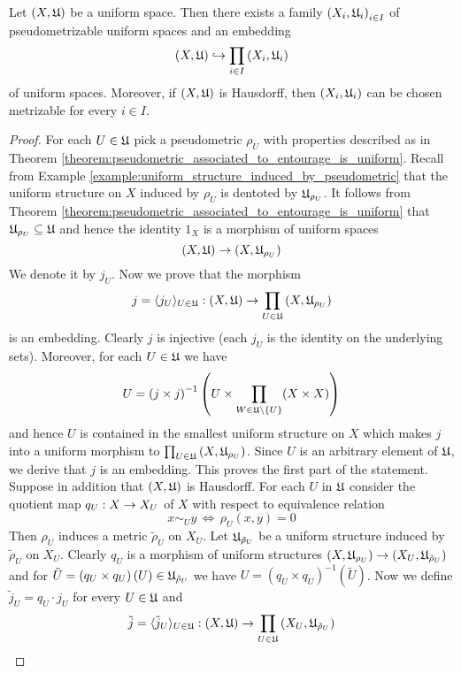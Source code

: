 \begin{theorem}\label{theorem:uniform_space_is_subspace_of_product_of_pseudometrizable_spaces}
Let $(X,{\mathfrak U})$ be a uniform space. Then there exists a family $\left(X_i,{\mathfrak U}_i\right)_{i\in I}$ of pseudometrizable uniform spaces and an embedding
$$\left(X,{\mathfrak U}\right)\hookrightarrow \prod_{i\in I}\left(X_i,{\mathfrak U}_i\right)$$
of uniform spaces. Moreover, if $\left(X,{\mathfrak U}\right)$ is Hausdorff, then $\left(X_i,{\mathfrak U}_i\right)$ can be chosen metrizable for every $i\in I$.
\end{theorem}
\begin{proof}
For each $U \in {\mathfrak U}$ pick a pseudometric $\rho_{U}$ with properties described as in Theorem \ref{theorem:pseudometric_associated_to_entourage_is_uniform}. Recall from Example \ref{example:uniform_structure_induced_by_pseudometric} that the uniform structure on $X$ induced by $\rho_U$ is dentoted by ${\mathfrak U}_{\rho_{U}}$. It follows from Theorem \ref{theorem:pseudometric_associated_to_entourage_is_uniform} that ${\mathfrak U}_{\rho_{U}}\subseteq {\mathfrak U}$ and hence the identity $1_X$ is a morphism of uniform spaces
$$\left(X,{\mathfrak U}\right)\rightarrow \left(X,{\mathfrak U}_{\rho_{U}}\right)$$
We denote it by $j_U$. Now we prove that the morphism 
$$j = \langle j_U\rangle_{U\in {\mathfrak U}}:\left(X,{\mathfrak U}\right)\rightarrow \prod_{U\in {\mathfrak U}}\left(X,{\mathfrak U}_{\rho_U}\right)$$
is an embedding. Clearly $j$ is injective (each $j_U$ is the identity on the underlying sets). Moreover, for each $U \in {\mathfrak U}$ we have
$$U = \left(j\times j\right)^{-1}\left(U\times \prod_{W\in {\mathfrak U}\setminus \{U\}}(X\times X)\right)$$
and hence $U$ is contained in the smallest uniform structure on $X$ which makes $j$ into a uniform morphism to $\prod_{U\in {\mathfrak U}}\left(X,{\mathfrak U}_{\rho_U}\right)$. Since $U$ is an arbitrary element of ${\mathfrak U}$, we derive that $j$ is an embedding. This proves the first part of the statement. Suppose in addition that $\left(X,{\mathfrak U}\right)$ is Hausdorff. For each $U$ in ${\mathfrak U}$ consider the quotient map $q_U:X\rightarrow X_U$ of $X$ with respect to equivalence relation 
$$x\sim_U y\,\Leftrightarrow\,\rho_U(x,y) = 0$$
Then $\rho_U$ induces a metric $\tilde{\rho}_U$ on $X_U$. Let ${\mathfrak U}_{\tilde{\rho}_U}$ be a uniform structure induced by $\tilde{\rho}_U$ on $X_U$. Clearly $q_U$ is a morphism of uniform structures $\left(X,{\mathfrak U}_{\rho_U}\right)\rightarrow \left(X_U,{\mathfrak U}_{\tilde{\rho}_U}\right)$ and for $\tilde{U} = \left(q_U\times q_U\right)(U) \in {\mathfrak U}_{\tilde{\rho}_U}$ we have $U = \left(q_U\times q_U\right)^{-1}\left(\tilde{U}\right)$. Now we define $\tilde{j}_U = q_U\cdot j_U$ for every $U \in {\mathfrak U}$ and 
$$\tilde{j} = \langle \tilde{j}_U\rangle_{U\in {\mathfrak U}}:\left(X,{\mathfrak U}\right)\rightarrow \prod_{U\in {\mathfrak U}}\left(X_U,{\mathfrak U}_{\tilde{\rho}_U}\right)$$

\end{proof}
